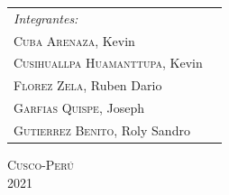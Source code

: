 \begin{titlepage}
\begin{center}
     \begin{tabular}{ll}
       \emph{Integrantes:}\\ [0.3cm]
       \hspace{3cm}   \textsc{Cuba Arenaza,} Kevin  \\
       \hspace{3cm}   \textsc{Cusihuallpa Huamanttupa,} Kevin  \\
       \hspace{3cm}   \textsc{Florez Zela,} Ruben Dario  \\
       \hspace{3cm}   \textsc{Garfias Quispe,} Joseph  \\
       \hspace{3cm}   \textsc{Gutierrez Benito,} Roly Sandro  \\
       

     \end{tabular}
     
     \vspace{4mm}
   \begin{center}
    \textsc{Cusco-Perú}\\
    \textsc{2021}
    \end{center}
     
   \end{center}
\end{titlepage}
